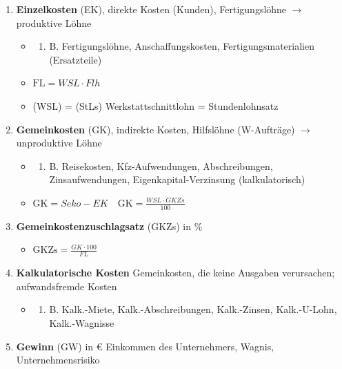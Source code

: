 \begin{enumerate}
\item
  \textbf{Einzelkosten} (EK), direkte Kosten (Kunden), Fertigungslöhne
  $\to$ produktive Löhne

  \begin{itemize}
  \item
    \begin{enumerate}
    \def\labelenumii{\alph{enumii}.}
    \setcounter{enumii}{25}
    \item
      B. Fertigungslöhne, Anschaffungskosten, Fertigungsmaterialien
      (Ersatzteile)
    \end{enumerate}
  \item
    $\boxed{\text{FL} = WSL \cdot Flh}$\\
  \item
    (WSL) = (StLs) Werkstattschnittlohn = Stundenlohnsatz
  \end{itemize}
\item
  \textbf{Gemeinkosten} (GK), indirekte Kosten, Hilfslöhne (W-Aufträge)
  $\to$ unproduktive Löhne

  \begin{itemize}
  \item
    \begin{enumerate}
    \def\labelenumii{\alph{enumii}.}
    \setcounter{enumii}{25}
    \item
      B. Reisekosten, Kfz-Aufwendungen, Abschreibungen,
      Zinsaufwendungen, Eigenkapital-Verzinsung (kalkulatorisch)
    \end{enumerate}
  \item
    $\boxed{\text{GK} = Seko - EK} \quad \boxed{\text{GK} = \frac{WSL \cdot GKZs}{100}}$\\
  \end{itemize}
\item
  \textbf{Gemeinkostenzuschlagsatz} (GKZs) in \%

  \begin{itemize}
  \item
    $\boxed{\text{GKZs} = \frac{GK \cdot 100}{FL}}$\\
  \end{itemize}
\item
  \textbf{Kalkulatorische Kosten} Gemeinkosten, die keine Ausgaben
  verursachen; aufwandsfremde Kosten

  \begin{itemize}
  \item
    \begin{enumerate}
    \def\labelenumii{\alph{enumii}.}
    \setcounter{enumii}{25}
    \item
      B. Kalk.-Miete, Kalk.-Abschreibungen, Kalk.-Zinsen, Kalk.-U-Lohn,
      Kalk.-Wagnisse
    \end{enumerate}
  \end{itemize}
\item
  \textbf{Gewinn} (GW) in € Einkommen des Unternehmers, Wagnis,
  Unternehmensrisiko


\end{enumerate}
